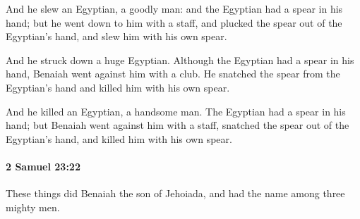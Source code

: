 			\begin{versebox}
					\item[BHS] 
					\item[ASV] And he slew an Egyptian, a goodly man: and the Egyptian had a spear in his hand; but he went down to him with a staff, and plucked the spear out of the Egyptian's hand, and slew him with his own spear.
					\item[NIV] And he struck down a huge Egyptian. Although the Egyptian had a spear in his hand, Benaiah went against him with a club. He snatched the spear from the Egyptian’s hand and killed him with his own spear.
					\item[NRSV] And he killed an Egyptian, a handsome man. The Egyptian had a spear in his hand; but Benaiah went against him with a staff, snatched the spear out of the Egyptian’s hand, and killed him with his own spear.
			\end{versebox}

		\paragraph{2 Samuel 23:22} %
			\label{2SAMUEL-23-22}

			These things did Benaiah the son of Jehoiada, and had the name among three mighty men.

